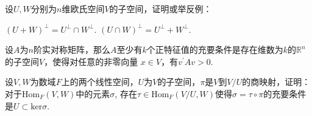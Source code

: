 \documentclass[windows]{BHCexam}
\begin{document}
\begin{groups}
        \begin{questions}
            \question 设$U,W$分别为$n$维欧氏空间$V$的子空间，证明或举反例：
            \begin{subquestions}
                \subquestion $(U+W)^\bot = U^\bot  \cap  W^\bot $.
                \subquestion $(U\cap W)^\bot = U^\bot  + W^\bot $.
            \end{subquestions}
        \end{questions}

        \begin{questions}
            \question 设$A$为$n$阶实对称矩阵，那么$A$至少有$k$个正特征值的充要条件是存在维数为$k$的$\mathbb{R}^n$的子空间$V$，使得对任意的非零向量
            $x \in V$，有$v^\prime A v > 0$.
        \end{questions}

        \begin{questions}
            \question 设$V,W$为数域$F$上的两个线性空间，$U$为$V$的子空间，$\pi$是$V$到$V/U$的商映射，证明：对于$\text{Hom}_F(V,W)$中的元素$\sigma$,
            存在$\tau \in \text{Hom}_F(V/U,W)$使得$\sigma=\tau \circ \pi$的充要条件是$U \subset \text{ker} \sigma$.
        \end{questions}
	\end{groups}
\end{document}
